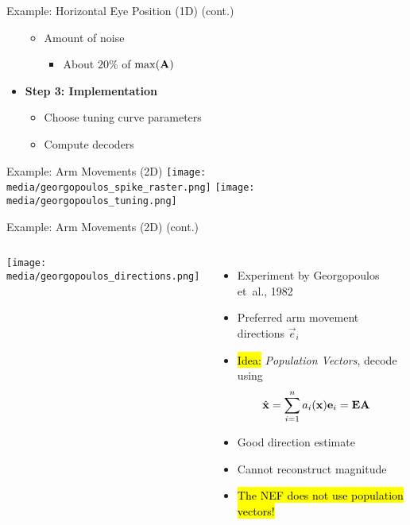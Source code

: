 \documentclass[handout,aspectratio=169]{beamer}
\begin{document}
\begin{frame}{Example: Horizontal Eye Position (1D) (cont.)}
\begin{multicols}{2}
\begin{itemize}
\begin{itemize}
				\item Amount of noise
				\begin{itemize}
					\setlength{\itemsep}{0.25cm}
					\item About $20\%$ of $\max({\mathbf{A}})$
				\end{itemize}
			\end{itemize}
			\item \textbf{Step 3: Implementation}
			\begin{itemize}
				\setlength{\itemsep}{0.25cm}
				\item Choose tuning curve parameters
				\item Compute decoders
			\end{itemize}
		\end{itemize}
	\end{multicols}
\end{frame}

\begin{frame}{Example: Arm Movements (2D)}
	\centering
	\texttt{[image: media/georgopoulos\_spike\_raster.png]}%
	\texttt{[image: media/georgopoulos\_tuning.png]}
\end{frame}

\begin{frame}{Example: Arm Movements (2D) (cont.)}
	\begin{columns}
		\centering
		\texttt{[image: media/georgopoulos\_directions.png]}%
		\begin{itemize}
			\setlength{\itemsep}{0.2cm}
			\item Experiment by Georgopoulos et~al., 1982
			\item Preferred arm movement directions $\vec e_i$
			\item \hl{Idea:} \emph{Population Vectors}, decode using
			\begin{align*}
				\hat{{\mathbf{x}}} &= \sum_{i=1}^n a_i({\mathbf{x}}) {\mathbf{e}}_i = {{\mathbf{E}}} {{\mathbf{A}}}
			\end{align*}
			\item[\OPlus]<2-> Good direction estimate
			\item[\OMinus]<3-> Cannot reconstruct magnitude
			\item[]<4-> \hl{The NEF does not use population vectors!}
		\end{itemize}
	\end{columns}
\end{frame}
\end{document}
